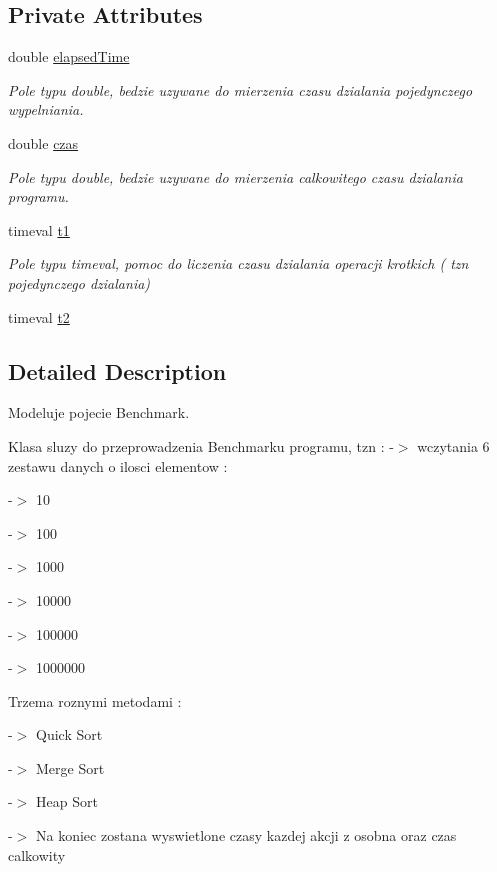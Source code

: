 \subsection*{Private Attributes}
\begin{DoxyCompactItemize}
\item 
double \hyperlink{classbenchmark_a90e6eda0144befd3f3bc1a881904fb57}{elapsed\-Time}
\begin{DoxyCompactList}\small\item\em Pole typu double, bedzie uzywane do mierzenia czasu dzialania pojedynczego wypelniania. \end{DoxyCompactList}\item 
double \hyperlink{classbenchmark_a563b747421276232836b7711b6881ec8}{czas}
\begin{DoxyCompactList}\small\item\em Pole typu double, bedzie uzywane do mierzenia calkowitego czasu dzialania programu. \end{DoxyCompactList}\item 
timeval \hyperlink{classbenchmark_a7789217b36df3b3ae427ceaaa2694d0b}{t1}
\begin{DoxyCompactList}\small\item\em Pole typu timeval, pomoc do liczenia czasu dzialania operacji krotkich ( tzn pojedynczego dzialania) \end{DoxyCompactList}\item 
timeval \hyperlink{classbenchmark_aea9f22e585c0c5826329e48a97a99803}{t2}
\end{DoxyCompactItemize}


\subsection{Detailed Description}
Modeluje pojecie Benchmark. 

Klasa sluzy do przeprowadzenia Benchmarku programu, tzn \-: -\/$>$ wczytania 6 zestawu danych o ilosci elementow \-: \par
-\/$>$ 10 \par
-\/$>$ 100 \par
-\/$>$ 1000 \par
-\/$>$ 10000 \par
-\/$>$ 100000 \par
-\/$>$ 1000000 \par
 Trzema roznymi metodami \-: \par
 -\/$>$ Quick Sort \par
 -\/$>$ Merge Sort \par
 -\/$>$ Heap Sort \par
-\/$>$ Na koniec zostana wyswietlone czasy kazdej akcji z osobna oraz czas calkowity 

